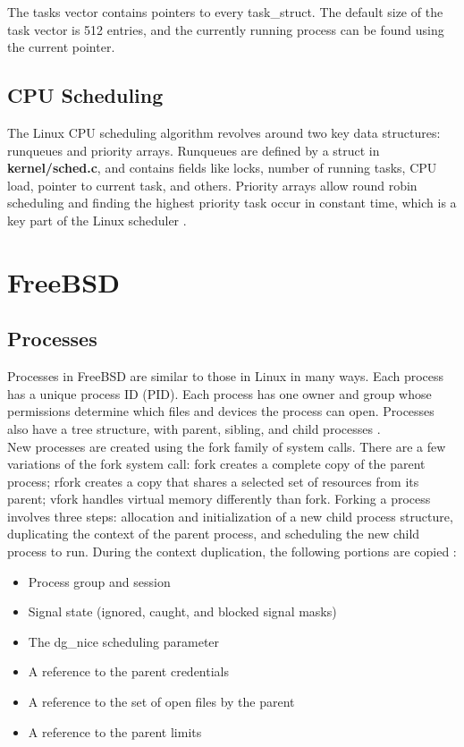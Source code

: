 \documentclass[letterpaper,draftclsnofoot,10pt,onecolumn,titlepage]{IEEEtran}\usepackage[margin=0.75in]{geometry}
\begin{document}
    The tasks vector contains pointers to every task\_struct. The default size of the task vector is 512 entries, and
    the currently running process can be found using the current pointer.
    
    \subsection{CPU Scheduling}
    The Linux CPU scheduling algorithm revolves around two key data structures: runqueues and priority arrays. 
    Runqueues are defined by a struct in \textbf{kernel/sched.c}, and contains fields like locks, number of running
    tasks, CPU load, pointer to current task, and others. Priority arrays allow round robin scheduling and finding 
    the highest priority task occur in constant time, which is a key part of the Linux scheduler \cite{linuxscheduler}.

\section{FreeBSD}
    \subsection{Processes}
    Processes in FreeBSD are similar to those in Linux in many ways. Each process has a unique process ID (PID). Each
    process has one owner and group whose permissions determine which files and devices the process can open. Processes
    also have a tree structure, with parent, sibling, and child processes \cite{freebsdfork}.
    \\
    New processes are created using the fork family of system calls. There are a few variations of the fork system call:
    fork creates a complete copy of the parent process; rfork creates a copy that shares a selected set of resources from
    its parent; vfork handles virtual memory differently than fork. Forking a process involves three steps: allocation and
    initialization of a new child process structure, duplicating the context of the parent process, and scheduling the 
    new child process to run. During the context duplication, the following portions are copied \cite{freebsdfork}:
    \begin{itemize}
    	\item Process group and session
	\item Signal state (ignored, caught, and blocked signal masks)
	\item The dg\_nice scheduling parameter 
	\item A reference to the parent credentials
	\item A reference to the set of open files by the parent
	\item A reference to the parent limits
    \end{itemize}
    
\end{document}
